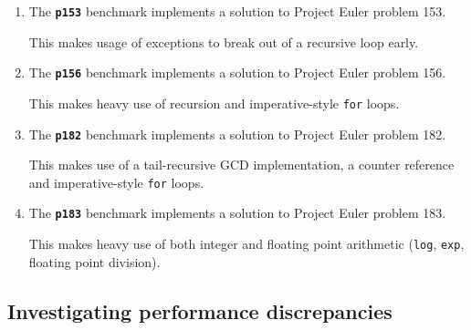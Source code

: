 \documentclass[12pt,a4paper,twoside,openright]{report}
\begin{document}
\begin{enumerate}
\item

The \textbf{\texttt{p153}} benchmark implements a solution to Project Euler problem 153.

This makes usage of exceptions to break out of a recursive loop early.

\item
  The \textbf{\texttt{p156}} benchmark implements a solution to Project Euler problem 156.

This makes heavy use of recursion and imperative-style \lstinline!for! loops.

\item
  The \textbf{\texttt{p182}} benchmark implements a solution to Project Euler problem 182.

This makes use of a tail-recursive GCD implementation, a counter reference and imperative-style \lstinline!for! loops.

\item
  The \textbf{\texttt{p183}} benchmark implements a solution to Project Euler problem 183.

This makes heavy use of both integer and floating point arithmetic (\lstinline!log!, \lstinline!exp!, floating point division).
\end{enumerate}


\subsection{Investigating performance discrepancies}
\end{document}
